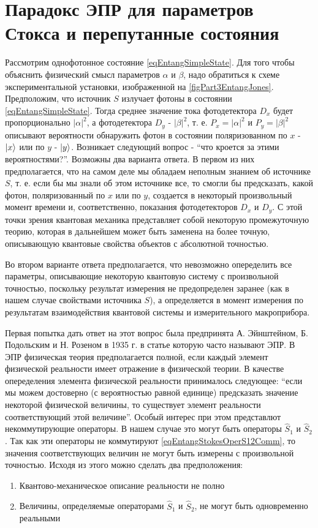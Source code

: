 \section{Парадокс ЭПР для параметров
  Стокса и перепутанные состояния}
\label{sec:part3:epr}
Рассмотрим однофотонное состояние \eqref{eqEntangSimpleState}. 
Для того чтобы объяснить
физический смысл параметров $\alpha$ и $\beta$, надо обратиться к схеме
экспериментальной установки, изображенной на
\autoref{figPart3EntangJones}. Предположим, что источник $S$ излучает
фотоны в состоянии \eqref{eqEntangSimpleState}. Тогда среднее значение
тока фотодетектора $D_x$ будет пропорционально
$\left|\alpha\right|^2$, а фотодетектора $D_y$ -
$\left|\beta\right|^2$, т. е. $P_x = \left|\alpha\right|^2$ и $P_y =
\left|\beta\right|^2$ описывают вероятности обнаружить фотон в
состоянии поляризованном по $x$ - $\ket{x}$ или по $y$ -
$\ket{y}$. Возникает следующий вопрос - ``что кроется за этими
вероятностями?''. Возможны два варианта ответа. В первом из них
предполагается, что на самом деле мы обладаем неполным знанием об источнике $S$,
т. е. если бы мы знали об этом источнике все, то смогли бы
предсказать, какой фотон, поляризованный по $x$ или по $y$, создается в
некоторый произвольный момент времени и, соответственно, показания
фотодетекторов $D_x$ и $D_y$. С этой точки зрения
квантовая механика представляет собой некоторую промежуточную
теорию, которая в дальнейшем может быть заменена на более точную,
описывающую квантовые свойства объектов с абсолютной точностью. 

Во втором варианте ответа предполагается, что невозможно опеределить
все параметры, описывающие некоторую квантовую систему с произвольной
точностью, поскольку результат измерения не предопределен заранее (как
в нашем случае свойствами источника $S$), а определяется в момент
измерения по результатам взаимодействия квантовой системы и
измерительного макроприбора. 

Первая попытка дать ответ на этот вопрос была предпринята 
А. Эйнштейном, Б. Подольским и Н. Розеном в 1935 г. в статье которую
часто называют ЭПР\cite{bEPR}.  
В ЭПР физическая теория предполагается
полной, если каждый элемент физической реальности имеет отражение в
физической теории. В качестве опеределения элемента физической
реальности принималось следующее: ``если мы можем достоверно (с
вероятностью равной единице) предсказать значение некоторой физической
величины, то существует элемент реальности соответствующий этой
величине''\cite{bBelokTimHrus}. Особый интерес при этом представлют
некоммутирующие операторы. В нашем случае это могут быть операторы
$\hat{S}_1$ и $\hat{S}_2$. Так как эти операторы не коммутируют
\eqref{eqEntangStokesOperS12Comm}, то
значения соответствующих величин не могут быть измерены с произвольной
точностью. Исходя из этого можно сделать два предположения:
\begin{enumerate}
\item Квантово-механическое описание реальности не полно
\item Величины, определяемые операторами $\hat{S}_1$ и $\hat{S}_2$, не
  могут быть одновременно реальными
\end{enumerate}

